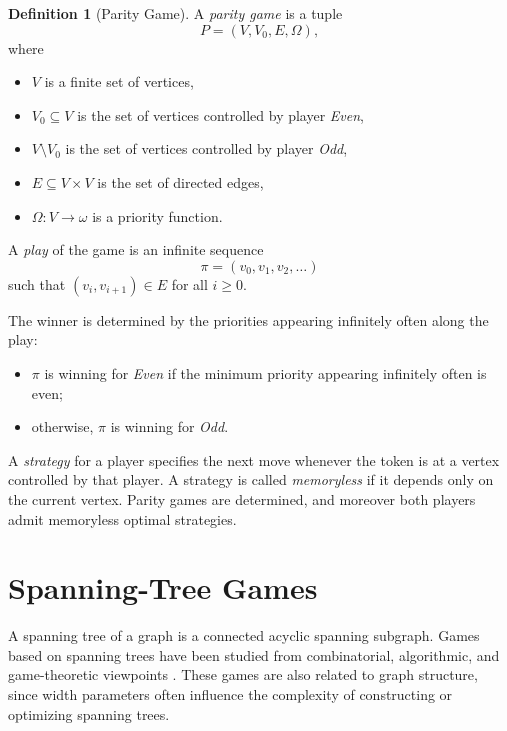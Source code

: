 \documentclass[10pt]{book}
\theoremstyle{definition}
\newtheorem{definition}[theorem]{Definition}
\begin{document}
\begin{definition}[Parity Game]
\cite{berwanger2006dag}
A \emph{parity game} is a tuple
\[
P=(V,V_0,E,\Omega),
\]
where
\begin{itemize}
    \item \(V\) is a finite set of vertices,
    \item \(V_0\subseteq V\) is the set of vertices controlled by player \emph{Even},
    \item \(V\setminus V_0\) is the set of vertices controlled by player \emph{Odd},
    \item \(E\subseteq V\times V\) is the set of directed edges,
    \item \(\Omega:V\to \omega\) is a priority function.
\end{itemize}

A \emph{play} of the game is an infinite sequence
\[
\pi=(v_0,v_1,v_2,\dots)
\]
such that \((v_i,v_{i+1})\in E\) for all \(i\geq 0\).

The winner is determined by the priorities appearing infinitely often along the play:
\begin{itemize}
    \item \(\pi\) is winning for \emph{Even} if the minimum priority appearing infinitely often is even;
    \item otherwise, \(\pi\) is winning for \emph{Odd}.
\end{itemize}

A \emph{strategy} for a player specifies the next move whenever the token is at a vertex controlled by that player.  
A strategy is called \emph{memoryless} if it depends only on the current vertex.  
Parity games are determined, and moreover both players admit memoryless optimal strategies.
\end{definition}

\section{Spanning-Tree Games}

A spanning tree of a graph is a connected acyclic spanning subgraph.  
Games based on spanning trees have been studied from combinatorial, algorithmic, and game-theoretic viewpoints \cite{hefetz2018spanning,nebel2010shortest,cardinal2013stackelberg}.  
These games are also related to graph structure, since width parameters often influence the complexity of constructing or optimizing spanning trees.
\end{document}
